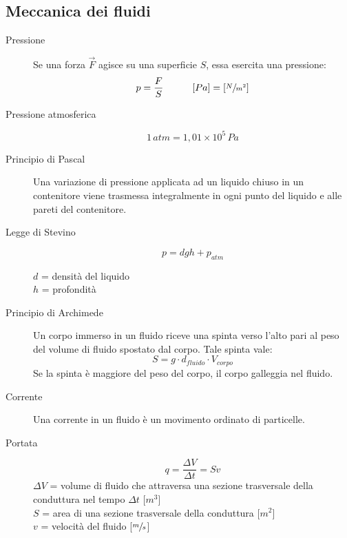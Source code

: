 \documentclass[a4paper,11pt,italian]{article}
\begin{document}
\subsection{Meccanica dei fluidi}

\begin{description}
  \item[Pressione] 
  Se una forza $ \vec{F} $ agisce su una superficie $ S $, essa esercita una pressione:
  \[ p = \frac{F}{S} \hspace*{3em} [Pa] = \left[ \sfrac{N}{m^2} \right] \]
  
  \item[Pressione atmosferica]
  \[ 1 \, atm = 1,01 \times 10^5 \, Pa \]
  
  \item[Principio di Pascal] 
  Una variazione di pressione applicata ad un liquido chiuso in un contenitore viene trasmessa integralmente in ogni punto del liquido e alle pareti del contenitore.
  
  \item[Legge di Stevino]
  \[ p = dgh + p_{atm} \]
  \begin{multicols}{2}
  $ d $ = densità del liquido\\
  $ h $ = profondità
  \end{multicols}
  
  \item[Principio di Archimede] 
  Un corpo immerso in un fluido riceve una spinta verso l'alto pari al peso del volume di fluido spostato dal corpo. Tale spinta vale:\[ S = g \cdot d_{fluido} \cdot V_{corpo} \]
  Se la spinta è maggiore del peso del corpo, il corpo galleggia nel fluido.
  
  \item[Corrente] 
  Una corrente in un fluido è un movimento ordinato di particelle.
  
  \item[Portata]
  \[ q = \frac{\Delta V}{\Delta t} = Sv \]
  $ \Delta V $ = volume di fluido che attraversa una sezione trasversale della conduttura nel tempo $ \Delta t $ [$ m^3 $]\\
  $ S $ = area di una sezione trasversale della conduttura [$ m^2 $]\\
  $ v $ = velocità del fluido [$ \sfrac{m}{s} $]


\end{description}
\end{document}
